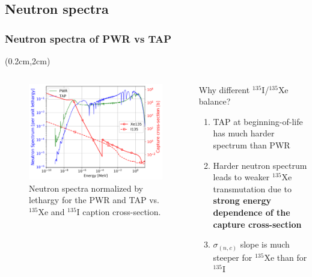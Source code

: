 \subsection{Neutron spectra}

\begin{frame}
\frametitle{Neutron spectra of PWR vs TAP}
\begin{textblock*}{12.3cm}(0.2cm,2cm) %
	\begin{columns}[t,onlytextwidth]
		\begin{figure}[t]
			\includegraphics[width=\linewidth]{./images/spectra.png}
			\caption{Neutron spectra normalized by lethargy for the PWR and 
			TAP vs. $^{135}$Xe and $^{135}$I caption cross-section.}
		\end{figure}
	
	
		\vspace{+1mm}
		\begin{block}{Why different $^{135}$I/$^{135}$Xe balance?}
			\begin{enumerate}             
				\item TAP at beginning-of-life has much harder spectrum than 
				PWR
				\item Harder neutron spectrum leads to weaker $^{135}$Xe 
				transmutation due to \textbf{strong energy dependence of the  
				capture cross-section}
				\item $\sigma_{(n,c)}$ slope is much steeper  for 
				$^{135}$Xe than for $^{135}$I
			\end{enumerate}
		\end{block}
	\end{columns}
\end{textblock*}
\end{frame}